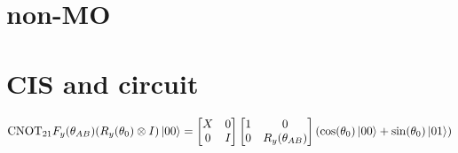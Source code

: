 \documentclass[11pt, oneside]{article}   	%
\begin{document}
\section{non-MO}

\section{CIS and circuit}
\begin{align}
\mathrm{CNOT}_{21} F_y(\theta_{AB}) (R_y(\theta_0) \otimes I) \ket{00} 
= 
\begin{bmatrix}
X & 0 \\
0 & I
\end{bmatrix}
\begin{bmatrix}
1 & 0 \\
0 & R_y(\theta_{AB})
\end{bmatrix}
(\cos(\theta_0) \ket{00} + \sin(\theta_0)\ket{01})
\end{align}
\end{document}
